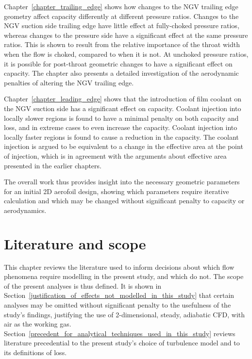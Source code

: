 \documentclass[a4paper, 11pt, oneside]{report}
\begin{document}
Chapter~\ref{chapter_trailing_edge} shows how changes to the NGV trailing edge geometry affect capacity differently at different pressure ratios. Changes to the NGV suction side trailing edge have little effect at fully-choked pressure ratios, whereas changes to the pressure side have a significant effect at the same pressure ratios. This is shown to result from the relative importance of the throat width when the flow is choked, compared to when it is not. At unchoked pressure ratios, it is possible for post-throat geometric changes to have a significant effect on capacity. The chapter also presents a detailed investigation of the aerodynamic penalties of altering the NGV trailing edge.

Chapter~\ref{chapter_leading_edge} shows that the introduction of film coolant on the NGV suction side has a significant effect on capacity. Coolant injection into locally slower regions is found to have a minimal penalty on both capacity and loss, and in extreme cases to even increase the capacity. Coolant injection into locally faster regions is found to cause a reduction in the capacity. The coolant injection is argued to be equivalent to a change in the effective area at the point of injection, which is in agreement with the arguments about effective area presented in the earlier chapters.

The overall work thus provides insight into the necessary geometric parameters for an initial 2D aerofoil design, showing which parameters require iterative calculation and which may be changed without significant penalty to capacity or aerodynamics.



\chapter{Literature and scope}
\label{chapter_literature_and_scope}

This chapter reviews the literature used to inform decisions about which flow phenomena require modelling in the present study, and which do not. The scope of the present analyses is thus defined. It is shown in Section~\ref{justification_of_effects_not_modelled_in_this_study} that certain analyses may be omitted without significant penalty to the usefulness of the study's findings, justifying the use of 2-dimensional, steady, adiabatic CFD, with air as the working gas. Section~\ref{precedent_for_analytical_techniques_used_in_this_study} reviews literature precedential to the present study's choice of turbulence model and to its definitions of loss.
\end{document}

